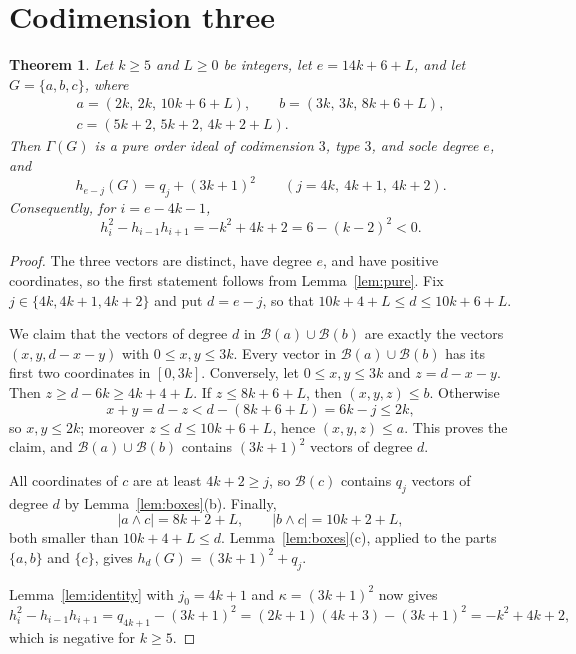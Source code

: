 \documentclass{amsart}
\newtheorem{theorem}{Theorem}[section]
\theoremstyle{definition}
\theoremstyle{remark}
\newcommand{\B}{\mathcal{B}}
\begin{document}
\section{Codimension three}\label{sec:three}

\begin{theorem}\label{thm:type3}
Let $k\ge 5$ and $L\ge 0$ be integers, let $e=14k+6+L$, and let $G=\{a,b,c\}$, where
\[
\begin{gathered}
a=(2k,\,2k,\,10k+6+L),\qquad b=(3k,\,3k,\,8k+6+L),\\
c=(5k+2,\,5k+2,\,4k+2+L).
\end{gathered}
\]
Then $\Gamma(G)$ is a pure order ideal of codimension $3$, type $3$, and socle degree $e$, and
\[
h_{e-j}(G)=q_j+(3k+1)^2\qquad (j=4k,\ 4k+1,\ 4k+2).
\]
Consequently, for $i=e-4k-1$,
\[
h_i^2-h_{i-1}h_{i+1}=-k^2+4k+2=6-(k-2)^2<0.
\]
\end{theorem}

\begin{proof}
The three vectors are distinct, have degree $e$, and have positive coordinates, so the first statement follows from Lemma~\ref{lem:pure}. Fix $j\in\{4k,4k+1,4k+2\}$ and put $d=e-j$, so that $10k+4+L\le d\le 10k+6+L$.

We claim that the vectors of degree $d$ in $\B(a)\cup\B(b)$ are exactly the vectors $(x,y,d-x-y)$ with $0\le x,y\le 3k$. Every vector in $\B(a)\cup\B(b)$ has its first two coordinates in $[0,3k]$. Conversely, let $0\le x,y\le 3k$ and $z=d-x-y$. Then $z\ge d-6k\ge 4k+4+L$. If $z\le 8k+6+L$, then $(x,y,z)\le b$. Otherwise
\[
x+y=d-z<d-(8k+6+L)=6k-j\le 2k,
\]
so $x,y\le 2k$; moreover $z\le d\le 10k+6+L$, hence $(x,y,z)\le a$. This proves the claim, and $\B(a)\cup\B(b)$ contains $(3k+1)^2$ vectors of degree $d$.

All coordinates of $c$ are at least $4k+2\ge j$, so $\B(c)$ contains $q_j$ vectors of degree $d$ by Lemma~\ref{lem:boxes}(b). Finally,
\[
|a\wedge c|=8k+2+L,\qquad |b\wedge c|=10k+2+L,
\]
both smaller than $10k+4+L\le d$. Lemma~\ref{lem:boxes}(c), applied to the parts $\{a,b\}$ and $\{c\}$, gives $h_d(G)=(3k+1)^2+q_j$.

Lemma~\ref{lem:identity} with $j_0=4k+1$ and $\kappa=(3k+1)^2$ now gives
\[
h_i^2-h_{i-1}h_{i+1}=q_{4k+1}-(3k+1)^2=(2k+1)(4k+3)-(3k+1)^2=-k^2+4k+2,
\]
which is negative for $k\ge 5$.
\end{proof}
\end{document}
